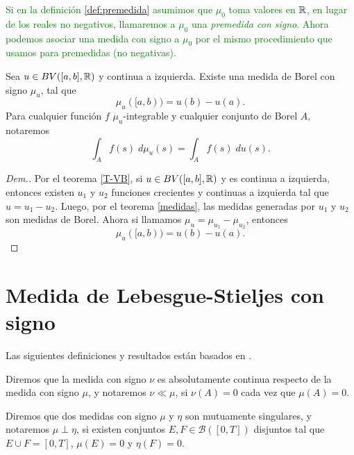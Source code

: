 
\textcolor{green}{
 Si en la definición \ref{def:premedida} asumimos que $\mu_0$ toma valores en $\mathbb{R}$, en lugar de los reales no negativos, llamaremos  a $\mu_0$ una \emph{premedida con signo}. Ahora podemos asociar una medida con signo a $\mu_0$ por el mismo procedimiento que usamos para premedidas (no negativas). }
 


\begin{thm} \label{Thm:medidas}
    	Sea $u\in BV([a,b],\mathbb{R})$ y continua a izquierda. Existe una medida de Borel con signo $\mu_{u}$, tal que $$\mu_{u}([a,b))=u(b)-u(a).$$  Para cualquier función $f$ $\mu_{u}$-integrable  y cualquier conjunto de Borel $A$, notaremos
	$$\int_{A}f(s)\;d\mu_{u}(s)=\int_{A}f(s)\;du(s).$$  
\end{thm}





\begin{proof}[Dem.]
Por el teorema \ref{T-VB}, si $u\in BV([a,b],\mathbb{R})$ y es continua a izquierda\textcolor{red}{,} entonces existen $u_1$ y $u_2$ funciones crecientes y continuas a izquierda tal que $u=u_1-u_2$. Luego\textcolor{red}{,} por el teorema \ref{medidas}\textcolor{red}{,}  las medidas generadas por $u_1$ y $u_2$ son medidas de Borel. Ahora si llamamos  $\mu_u=\mu_{u_1}-\mu_{u_2}$\textcolor{red}{,}   entonces
$$\mu_{u}([a,b))=u(b)-u(a).$$
\end{proof}


\section{Medida de Lebesgue-Stieljes con signo}

Las siguientes definiciones y resultados están basados en \cite[Capitulo 3]{folland}.

\begin{defi}
	Diremos que la medida con signo $\nu$ es absolutamente continua  respecto de la medida con signo $\mu$, y  notaremos $\nu\ll\mu$\index[Simbolo]{$\ll$}, si $\nu(A)=0$ cada vez que  $\mu(A)=0$.
\end{defi}


\begin{defi}
	Diremos que dos medidas con signo $\mu$ y $\eta$ son mutuamente singulares, y  notaremos $\mu\perp \eta$,  si existen conjuntos $E,F\in\mathscr{B}([0,T])$ disjuntos tal que $E\cup F=[0,T]$, $\mu(E)=0$ y $\eta(F)=0$. \index[Simbolo]{$\perp$}
\end{defi}

